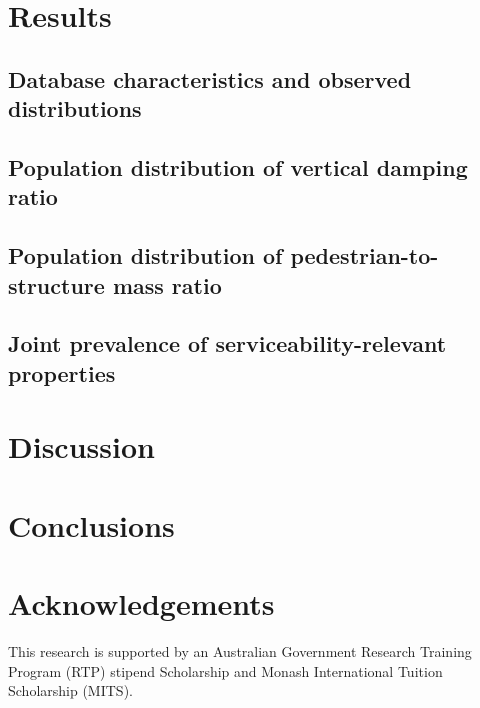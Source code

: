 \documentclass[preprint,a4paper,12pt]{elsarticle}
\begin{document}
\section{Results}
\subsection{Database characteristics and observed distributions}
\subsection{Population distribution of vertical damping ratio}
\subsection{Population distribution of pedestrian-to-structure mass ratio}
\subsection{Joint prevalence of serviceability-relevant properties}

\section{Discussion}

\section{Conclusions}

\section{Acknowledgements}
This research is supported by an Australian Government Research Training Program (RTP) stipend Scholarship and Monash International Tuition Scholarship (MITS). 

%


\end{document}
